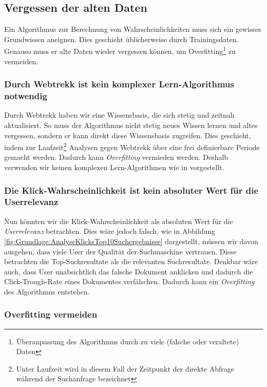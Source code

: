 \subsection{Vergessen der alten Daten}
\label{sec:Reranking:Methodik:Vergessen}

Ein Algorithmus zur Berechnung von Wahrscheinlichkeiten muss sich ein gewisses Grundwissen aneignen. Dies geschieht üblicherweise durch Trainingsdaten. Genauso muss er alte Daten wieder vergessen können, um Overfitting\footnote{Überanpassung des Algorithmus durch zu viele (falsche oder veraltete) Daten} zu vermeiden. 

\subsubsection{Durch Webtrekk ist kein komplexer Lern-Algorithmus notwendig}
\label{sec:Reranking:Methodik:Vergessen:Lern-Algorithmus}

Durch Webtrekk haben wir eine Wissensbasis, die sich stetig und zeitnah aktualisiert. So muss der Algorithmus nicht stetig neues Wissen lernen und altes vergessen, sondern er kann direkt diese Wissensbasis zugreifen. Dies geschieht, indem zur Laufzeit\footnote{Unter Laufzeit wird in diesem Fall der Zeitpunkt der direkte Abfrage während der Suchanfrage bezeichnet} Analysen gegen Webtrekk über eine frei definierbare Periode gemacht werden. Dadurch kann \textit{Overfitting} vermieden werden. Deshalb verwenden wir keinen komplexen Lern-Algorithmen wie in \cite{IWUSBI} vorgestellt.

\subsubsection{Die Klick-Wahrscheinlichkeit ist kein absoluter Wert für die Userrelevanz}
\label{sec:Reranking:Methodik:Vergessen:Relevanzfeedback}

Nun könnten wir die Klick-Wahrscheinlichkeit als absoluten Wert für die \textit{Userrelevanz} betrachten. Dies wäre jedoch falsch, wie in Abbildung \ref{fig:Grundlage:AnalyseKlicksTop10Suchergebnisse} dargestellt, müssen wir davon ausgehen, dass viele User der Qualität der Suchmaschine vertrauen. Diese betrachten die Top-Suchresultate als die relevanten Suchresultate. Denkbar wäre auch, dass User unabsichtlich das falsche Dokument anklicken und dadurch die Click-Trough-Rate eines Dokumentes verfälschen. Dadurch kann ein \textit{Overfitting} des Algorithmus entstehen.

\subsubsection{Overfitting vermeiden}
\label{sec:Reranking:Methodik:Vergessen:Overfitting}

